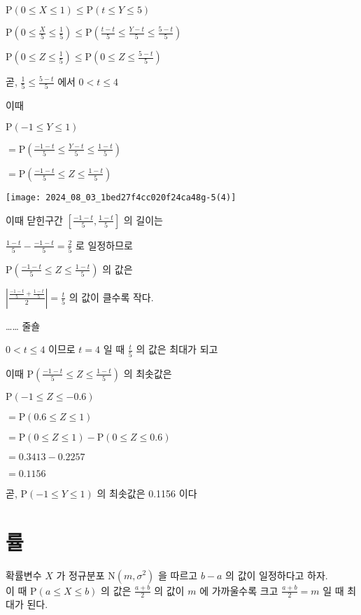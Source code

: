 \documentclass[10pt]{article}
\begin{document}
\(\mathrm{P}(0 \leq X \leq 1) \leq \mathrm{P}(t \leq Y \leq 5)\)

\(\mathrm{P}\left(0 \leq \frac{X}{5} \leq \frac{1}{5}\right) \leq \mathrm{P}\left(\frac{t-t}{5} \leq \frac{Y-t}{5} \leq \frac{5-t}{5}\right)\)

\(\mathrm{P}\left(0 \leq Z \leq \frac{1}{5}\right) \leq \mathrm{P}\left(0 \leq Z \leq \frac{5-t}{5}\right)\)

곧, \(\frac{1}{5} \leq \frac{5-t}{5}\) 에서 \(0<t \leq 4\)

이때

\(\mathrm{P}(-1 \leq Y \leq 1)\)

\(=\mathrm{P}\left(\frac{-1-t}{5} \leq \frac{Y-t}{5} \leq \frac{1-t}{5}\right)\)

\(=\mathrm{P}\left(\frac{-1-t}{5} \leq Z \leq \frac{1-t}{5}\right)\)

\begin{center}
\texttt{[image: 2024\_08\_03\_1bed27f4cc020f24ca48g-5(4)]}
\end{center}

이때 닫힌구간 \(\left[\frac{-1-t}{5}, \frac{1-t}{5}\right]\) 의 길이는

\(\frac{1-t}{5}-\frac{-1-t}{5}=\frac{2}{5}\) 로 일정하므로

\(\mathrm{P}\left(\frac{-1-t}{5} \leq Z \leq \frac{1-t}{5}\right)\) 의 값은

\(\left|\frac{\frac{-1-t}{5}+\frac{1-t}{5}}{2}\right|=\frac{t}{5}\) 의 값이 클수록 작다.

…… 줄숄

\(0<t \leq 4\) 이므로 \(t=4\) 일 때 \(\frac{t}{5}\) 의 값은 최대가 되고

이때 \(\mathrm{P}\left(\frac{-1-t}{5} \leq Z \leq \frac{1-t}{5}\right)\) 의 최솟값은

\(\mathrm{P}(-1 \leq Z \leq-0.6)\)

\(=\mathrm{P}(0.6 \leq Z \leq 1)\)

\(=\mathrm{P}(0 \leq Z \leq 1)-\mathrm{P}(0 \leq Z \leq 0.6)\)

\(=0.3413-0.2257\)

\(=0.1156\)

곧, \(\mathrm{P}(-1 \leq Y \leq 1)\) 의 최솟값은 0.1156 이다

\section*{률}
확률변수 \(X\) 가 정규분포 \(\mathrm{N}\left(m, \sigma^{2}\right)\) 을 따르고 \(b-a\) 의 값이 일정하다고 하자.\\
이 때 \(\mathrm{P}(a \leq X \leq b)\) 의 값은 \(\frac{a+b}{2}\) 의 값이 \(m\) 에 가까울수록 크고 \(\frac{a+b}{2}=m\) 일 때 최대가 된다.
\end{document}
